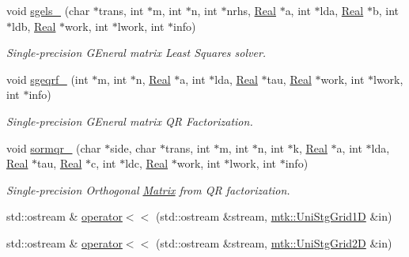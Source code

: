 \begin{DoxyCompactItemize}
\item 
void \hyperlink{namespacemtk_ada6df1b733204aa7ff0b1ec7556288f9}{sgels\+\_\+} (char $\ast$trans, int $\ast$m, int $\ast$n, int $\ast$nrhs, \hyperlink{group__c01-roots_gac080bbbf5cbb5502c9f00405f894857d}{Real} $\ast$a, int $\ast$lda, \hyperlink{group__c01-roots_gac080bbbf5cbb5502c9f00405f894857d}{Real} $\ast$b, int $\ast$ldb, \hyperlink{group__c01-roots_gac080bbbf5cbb5502c9f00405f894857d}{Real} $\ast$work, int $\ast$lwork, int $\ast$info)
\begin{DoxyCompactList}\small\item\em Single-\/precision G\+Eneral matrix Least Squares solver. \end{DoxyCompactList}\item 
void \hyperlink{namespacemtk_aece7419193d8ab43e186c97ad6d529fb}{sgeqrf\+\_\+} (int $\ast$m, int $\ast$n, \hyperlink{group__c01-roots_gac080bbbf5cbb5502c9f00405f894857d}{Real} $\ast$a, int $\ast$lda, \hyperlink{group__c01-roots_gac080bbbf5cbb5502c9f00405f894857d}{Real} $\ast$tau, \hyperlink{group__c01-roots_gac080bbbf5cbb5502c9f00405f894857d}{Real} $\ast$work, int $\ast$lwork, int $\ast$info)
\begin{DoxyCompactList}\small\item\em Single-\/precision G\+Eneral matrix Q\+R Factorization. \end{DoxyCompactList}\item 
void \hyperlink{namespacemtk_a59c58408e1c0a9837b67a417be986b82}{sormqr\+\_\+} (char $\ast$side, char $\ast$trans, int $\ast$m, int $\ast$n, int $\ast$k, \hyperlink{group__c01-roots_gac080bbbf5cbb5502c9f00405f894857d}{Real} $\ast$a, int $\ast$lda, \hyperlink{group__c01-roots_gac080bbbf5cbb5502c9f00405f894857d}{Real} $\ast$tau, \hyperlink{group__c01-roots_gac080bbbf5cbb5502c9f00405f894857d}{Real} $\ast$c, int $\ast$ldc, \hyperlink{group__c01-roots_gac080bbbf5cbb5502c9f00405f894857d}{Real} $\ast$work, int $\ast$lwork, int $\ast$info)
\begin{DoxyCompactList}\small\item\em Single-\/precision Orthogonal \hyperlink{classmtk_1_1Matrix}{Matrix} from Q\+R factorization. \end{DoxyCompactList}\item 
std\+::ostream \& \hyperlink{namespacemtk_a97f79d150b3b5c7b76d4fcc2271f972b}{operator$<$$<$} (std\+::ostream \&stream, \hyperlink{classmtk_1_1UniStgGrid1D}{mtk\+::\+Uni\+Stg\+Grid1\+D} \&in)
\item 
std\+::ostream \& \hyperlink{namespacemtk_a82cd99c0c7e695e4eccfbe7380525959}{operator$<$$<$} (std\+::ostream \&stream, \hyperlink{classmtk_1_1UniStgGrid2D}{mtk\+::\+Uni\+Stg\+Grid2\+D} \&in)
\end{DoxyCompactItemize}

